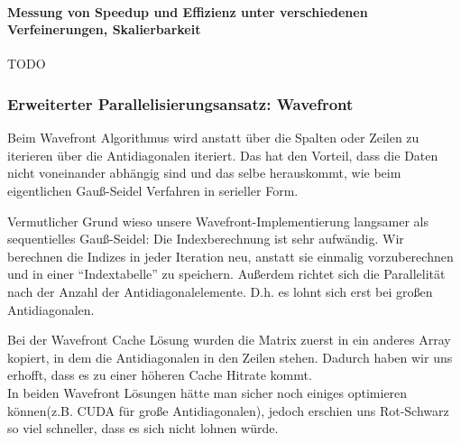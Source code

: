 \documentclass{article}
\begin{document}
\newpage

\paragraph{Messung von Speedup und Effizienz unter verschiedenen Verfeinerungen, Skalierbarkeit} 
TODO

\subsubsection{Erweiterter Parallelisierungsansatz: Wavefront}
Beim Wavefront Algorithmus wird anstatt über die Spalten oder Zeilen zu iterieren über die Antidiagonalen iteriert. Das hat den Vorteil, dass die Daten nicht voneinander abhängig sind und das selbe herauskommt, wie beim eigentlichen Gauß-Seidel Verfahren in serieller Form.

Vermutlicher Grund wieso unsere Wavefront-Implementierung langsamer als sequentielles Gauß-Seidel: Die Indexberechnung ist sehr aufwändig. Wir berechnen  die Indizes in jeder Iteration neu, anstatt sie einmalig vorzuberechnen und in einer ``Indextabelle'' zu speichern. Außerdem richtet sich die Parallelität nach der Anzahl der Antidiagonalelemente. D.h. es lohnt sich erst bei großen Antidiagonalen.

Bei der Wavefront Cache Lösung wurden die Matrix zuerst in ein anderes Array kopiert, in dem die Antidiagonalen in den Zeilen stehen. Dadurch haben wir uns erhofft, dass es zu einer höheren Cache Hitrate kommt. \\
In beiden Wavefront Lösungen hätte man sicher noch einiges optimieren können(z.B. CUDA für große Antidiagonalen), jedoch erschien uns Rot-Schwarz so viel schneller, dass es sich nicht lohnen würde.
\end{document}

